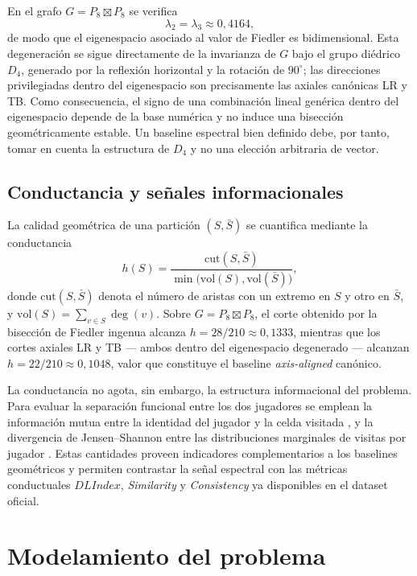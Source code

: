 \documentclass[journal]{IEEEtran}
\newcommand{\vol}{\mathrm{vol}}
\newcommand{\cut}{\mathrm{cut}}
\begin{document}
En el grafo $G = P_8 \boxtimes P_8$ se verifica
\[
\lambda_2 = \lambda_3 \approx 0{,}4164,
\]
de modo que el eigenespacio asociado al valor de Fiedler es bidimensional. Esta degeneración se sigue directamente de la invarianza de $G$ bajo el grupo diédrico $D_4$, generado por la reflexión horizontal y la rotación de $90^\circ$; las direcciones privilegiadas dentro del eigenespacio son precisamente las axiales canónicas LR y TB. Como consecuencia, el signo de una combinación lineal genérica dentro del eigenespacio depende de la base numérica y no induce una bisección geométricamente estable. Un baseline espectral bien definido debe, por tanto, tomar en cuenta la estructura de $D_4$ y no una elección arbitraria de vector.

\subsection{Conductancia y señales informacionales}

La calidad geométrica de una partición $(S,\bar S)$ se cuantifica mediante la conductancia
\begin{equation}
h(S)=\frac{\cut(S,\bar S)}{\min\bigl(\vol(S),\vol(\bar S)\bigr)},
\label{eq:conductance}
\end{equation}
donde $\cut(S,\bar S)$ denota el número de aristas con un extremo en $S$ y otro en $\bar S$, y $\vol(S)=\sum_{v\in S}\deg(v)$. Sobre $G=P_8\boxtimes P_8$, el corte obtenido por la bisección de Fiedler ingenua alcanza $h=28/210\approx 0{,}1333$, mientras que los cortes axiales LR y TB --- ambos dentro del eigenespacio degenerado --- alcanzan $h=22/210\approx 0{,}1048$, valor que constituye el baseline \emph{axis-aligned} canónico.

La conductancia no agota, sin embargo, la estructura informacional del problema. Para evaluar la separación funcional entre los dos jugadores se emplean la información mutua entre la identidad del jugador y la celda visitada \cite{cover2006}, y la divergencia de Jensen--Shannon entre las distribuciones marginales de visitas por jugador \cite{lin1991}. Estas cantidades proveen indicadores complementarios a los baselines geométricos y permiten contrastar la señal espectral con las métricas conductuales $DLIndex$, \emph{Similarity} y \emph{Consistency} ya disponibles en el dataset oficial.

\section{Modelamiento del problema}
\end{document}

